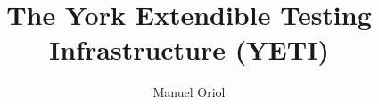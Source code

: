 \documentclass{llncs}
\begin{document}
\mainmatter

\title{The York Extendible Testing Infrastructure (YETI)}


\author{Manuel Oriol}



\maketitle

\newcommand{\subtype}{\ensuremath{\unlhd}}

\begin{abstract}

\end{abstract}











\end{document}

